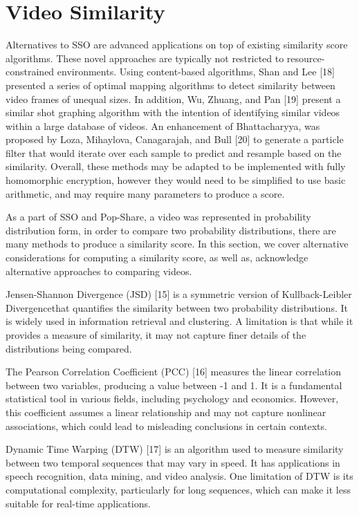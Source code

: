 \section{Video Similarity}

Alternatives to SSO are advanced applications on top of existing similarity score algorithms. These novel approaches are typically not restricted to resource-constrained environments. Using content-based algorithms, Shan and Lee [18] presented a series of optimal mapping algorithms to detect similarity between video frames of unequal sizes. In addition, Wu, Zhuang, and Pan [19] present a similar shot graphing algorithm with the intention of identifying similar videos within a large database of videos. An enhancement of Bhattacharyya, was proposed by Loza, Mihaylova, Canagarajah, and Bull [20] to generate a particle filter that would iterate over each sample to predict and resample based on the similarity. Overall, these methods may be adapted to be implemented with fully homomorphic encryption, however they would need to be simplified to use basic arithmetic, and may require many parameters to produce a score.

As a part of SSO and Pop-Share, a video was represented in probability distribution form, in order to compare two probability distributions, there are many methods to produce a similarity score. In this section, we cover alternative considerations for computing a similarity score, as well as, acknowledge alternative approaches to comparing videos.

Jensen-Shannon Divergence (JSD) [15] is a symmetric version of Kullback-Leibler Divergencethat quantifies the similarity between two probability distributions. It is widely used in information retrieval and clustering. A limitation is that while it provides a measure of similarity, it may not capture finer details of the distributions being compared. 



The Pearson Correlation Coefficient (PCC) [16] measures the linear correlation between two variables, producing a value between -1 and 1. It is a fundamental statistical tool in various fields, including psychology and economics. However, this coefficient assumes a linear relationship and may not capture nonlinear associations, which could lead to misleading conclusions in certain contexts. 



Dynamic Time Warping (DTW) [17] is an algorithm used to measure similarity between two temporal sequences that may vary in speed. It has applications in speech recognition, data mining, and video analysis. One limitation of DTW is its computational complexity, particularly for long sequences, which can make it less suitable for real-time applications. 

